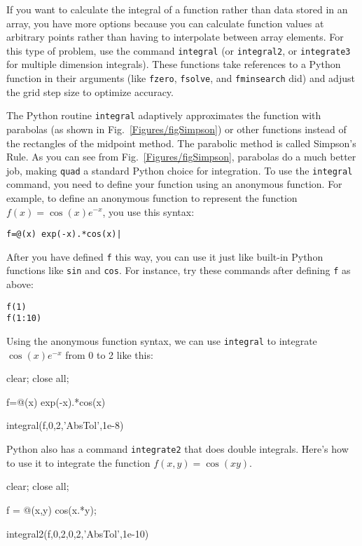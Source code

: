 If you want to calculate the integral of a function rather than data stored
in an array, you have more options because you can calculate function values
at arbitrary points rather than having to interpolate between array elements.
For this type of problem, use the command {\tt integral} (or {\tt integral2},
or {\tt integrate3} for multiple dimension integrals).  These functions take
references to a Python function in their arguments (like {\tt fzero},
\texttt{fsolve}, and \texttt{fminsearch} did) and adjust the grid step size
to optimize accuracy.

The Python routine {\tt integral} adaptively approximates the function with
parabolas (as shown in Fig.~\ref{Figures/figSimpson}) or other functions instead of
the rectangles of the midpoint method. The parabolic method is called
Simpson's Rule. As you can see from Fig.~\ref{Figures/figSimpson}, parabolas do a
much better job, making {\tt quad} a standard Python choice for integration.
To use the {\tt integral} command, you need to define your function using an
anonymous function.  For example, to
define an anonymous function to represent the function $f(x) = \cos(x)
e^{-x}$, you use this syntax:
\begin{Verbatim}
f=@(x) exp(-x).*cos(x)|
\end{Verbatim}
After you have defined {\tt f} this way, you can use it just like built-in
Python functions like {\tt sin} and {\tt cos}.  For instance, try these
commands after defining {\tt f} as above:
\begin{Verbatim}
f(1)
f(1:10)
\end{Verbatim}
Using the anonymous function syntax, we can use {\tt integral} to integrate
$\cos(x) e^{-x}$ from 0 to 2 like this:



\begin{codeexample}
\begin{VerbatimOut}{\listingFile}
clear; close all;

f=@(x) exp(-x).*cos(x)

integral(f,0,2,'AbsTol',1e-8)
\end{VerbatimOut}
\end{codeexample}

Python also has a command {\tt integrate2} that does double integrals. Here's
how to use it to integrate the function $f(x,y) = \cos (xy)$.

\begin{codeexample}[f2int.py]
\begin{VerbatimOut}{\listingFile}
clear; close all;

f = @(x,y) cos(x.*y);

integral2(f,0,2,0,2,'AbsTol',1e-10)
\end{VerbatimOut}
\end{codeexample}
